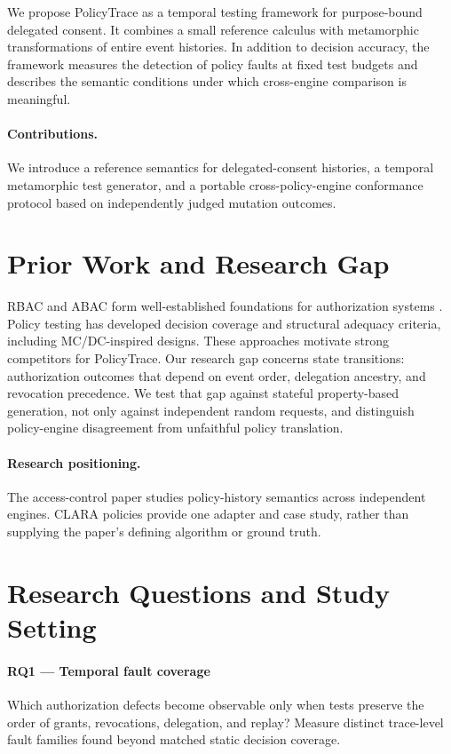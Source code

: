 \documentclass[11pt,a4paper]{article}
\begin{document}
We propose PolicyTrace as a temporal testing framework for purpose-bound delegated consent. It combines a small reference calculus with metamorphic transformations of entire event histories. In addition to decision accuracy, the framework measures the detection of policy faults at fixed test budgets and describes the semantic conditions under which cross-engine comparison is meaningful.

\paragraph{Contributions.} We introduce a reference semantics for delegated-consent histories, a temporal metamorphic test generator, and a portable cross-policy-engine conformance protocol based on independently judged mutation outcomes.

\section{Prior Work and Research Gap}
RBAC and ABAC form well-established foundations for authorization systems \cite{sandhu1996,hu2014}. Policy testing has developed decision coverage and structural adequacy criteria, including MC/DC-inspired designs. These approaches motivate strong competitors for PolicyTrace. Our research gap concerns state transitions: authorization outcomes that depend on event order, delegation ancestry, and revocation precedence. We test that gap against stateful property-based generation, not only against independent random requests, and distinguish policy-engine disagreement from unfaithful policy translation.

\paragraph{Research positioning.} The access-control paper studies policy-history semantics across independent engines. CLARA policies provide one adapter and case study, rather than supplying the paper’s defining algorithm or ground truth.

\section{Research Questions and Study Setting}
\paragraph{RQ1 — Temporal fault coverage} Which authorization defects become observable only when tests preserve the order of grants, revocations, delegation, and replay? Measure distinct trace-level fault families found beyond matched static decision coverage.
\end{document}
